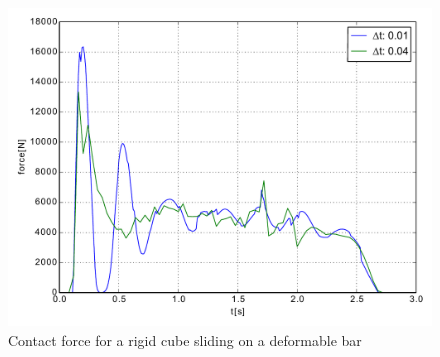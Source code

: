\begin{figure}[tbp]
\centering
\includegraphics[width=0.60\linewidth]{pics/pdf/slidingCube_redef_dt.pdf} 
\caption{Contact force for a rigid cube sliding on a deformable bar}
\label{fig::force_redef}
\end{figure}
